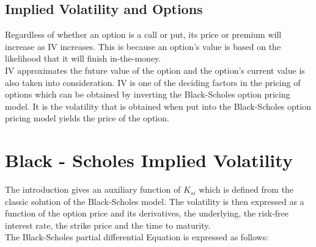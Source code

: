 \documentclass[a4 paper, 12pt]{report}
\theoremstyle{plain}
\newtheorem{definition}[theorem]{\textbf{Definition}}
\begin{document}
\subsection{Implied Volatility and Options}
\normalfont
\par Regardless of whether an option is a call or put, its price or premium will increase as IV increases. This is because an option’s value is based on the likelihood that it will finish in-the-money.\\

IV approximates the future value of the option and the option’s current value is also taken into consideration. IV is one of the deciding factors in the pricing of options which can be obtained by inverting the Black-Scholes option pricing model. It is the volatility that is obtained when put into the Black-Scholes option pricing model yields the price of the option.

\section{Black - Scholes Implied Volatility}
\noindent
\par The introduction gives an auxiliary function of $K_{si}$ which is defined from the classic solution of the Black-Scholes model. The volatility is then expressed as a function of the option price and its derivatives, the underlying, the risk-free interest rate, the strike price and the time to maturity.\\

The Black-Scholes partial differential Equation is expressed as follows:


%
%
%
%
%
%
%
%
%
%
%
%
%
%
\end{document}
